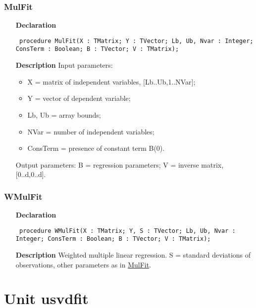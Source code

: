 \documentclass[12pt,a4paper,oneside]{report}
\newcommand{\declarationitem}[1]{\textbf{#1}}
\newcommand{\descriptiontitle}[1]{\textbf{#1}}
\newcommand{\code}[1]{\texttt{#1}}
\begin{document}
\subsubsection{MulFit}
\label{umulfit-MulFit}
\begin{itemize}\item[\declarationitem{Declaration}\hfill]
	\begin{flushleft}
		\code{
			procedure MulFit(X : TMatrix; Y : TVector; Lb, Ub, Nvar : Integer; ConsTerm : Boolean; B : TVector; V : TMatrix);}
		
	\end{flushleft}
	
	\par
	\item[\descriptiontitle{Description}]
	Input parameters: 
	\begin{itemize}
		\item X = matrix of independent variables, [Lb..Ub,1..NVar];
		\item Y = vector of dependent variable; 
		\item Lb, Ub = array bounds; 
		\item NVar = number of independent variables; 
		\item ConsTerm = presence of constant term B(0). 
	\end{itemize}
	Output parameters: B = regression parameters; V = inverse matrix, [0..d,0..d].
\end{itemize}
\subsubsection{WMulFit}
\label{umulfit-WMulFit}
\begin{itemize}\item[\declarationitem{Declaration}\hfill]
	\begin{flushleft}
		\code{
			procedure WMulFit(X : TMatrix; Y, S : TVector; Lb, Ub, Nvar : Integer; ConsTerm : Boolean; B : TVector; V : TMatrix);}
		
	\end{flushleft}
	
	\par
	\item[\descriptiontitle{Description}]
	Weighted multiple linear regression. S = standard deviations of observations, other parameters as in \hyperref[umulfit-MulFit]{MulFit}.
	
\end{itemize}
\section{Unit usvdfit}
\label{usvdfit}
\end{document}
